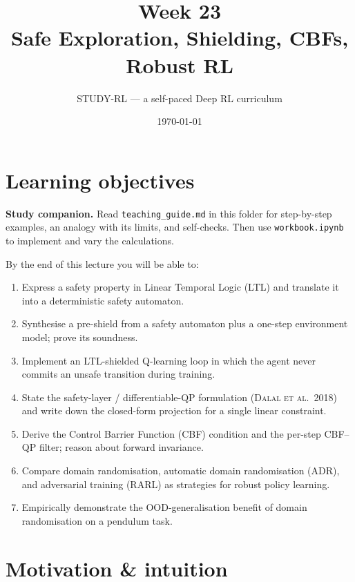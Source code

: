\documentclass[11pt,oneside]{scrbook}
\title{{\color{rlblue}\textbf{Week 23} \\ \Huge Safe Exploration, Shielding, CBFs, Robust RL}}
\author{STUDY-RL --- a self-paced Deep RL curriculum}
\date{\today}
\begin{document}
\maketitle
\tableofcontents
\newpage

\chapter*{Learning objectives}


\noindent\textbf{Study companion.} Read \texttt{teaching\_guide.md} in this
folder for step-by-step examples, an analogy with its limits, and self-checks.
Then use \texttt{workbook.ipynb} to implement and vary the calculations.
\par\medskip

\begin{keyidea}
By the end of this lecture you will be able to:
\begin{enumerate}[leftmargin=*]
  \item Express a safety property in Linear Temporal Logic (LTL) and translate
        it into a deterministic safety automaton.
  \item Synthesise a pre-shield from a safety automaton plus a one-step
        environment model; prove its soundness.
  \item Implement an LTL-shielded Q-learning loop in which the agent never
        commits an unsafe transition during training.
  \item State the safety-layer / differentiable-QP formulation
        (\textsc{Dalal et al.\ 2018}) and write down the closed-form
        projection for a single linear constraint.
  \item Derive the Control Barrier Function (CBF) condition and the
        per-step CBF--QP filter; reason about forward invariance.
  \item Compare domain randomisation, automatic domain randomisation (ADR),
        and adversarial training (RARL) as strategies for robust policy
        learning.
  \item Empirically demonstrate the OOD-generalisation benefit of domain
        randomisation on a pendulum task.
\end{enumerate}
\end{keyidea}

\chapter{Motivation \& intuition}
\end{document}
